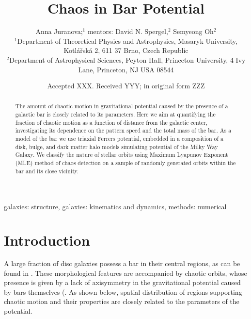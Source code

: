 \documentclass[a4paper,fleqn,usenatbib]{mnras}
\title[Chaos in Bar Potential]{Chaos in Bar Potential}
\author[A. Juranova et al.]{
Anna Juranova;$^{1}$ %
mentors: David N. Spergel,$^{2}$
Semyeong Oh$^{2}$
\\
$^{1}$Department of Theoretical Physics and Astrophysics, Masaryk University, Kotl\'a\v{r}sk\'a 2, 611 37 Brno, Czech Republic\\ %
$^{2}$Department of Astrophysical Sciences, Peyton Hall, Princeton University, 4 Ivy Lane, Princeton, NJ USA 08544\\
}
\date{Accepted XXX. Received YYY; in original form ZZZ}
\begin{document}
\label{firstpage}
\pagerange{\pageref{firstpage}--\pageref{lastpage}}
\maketitle

\begin{abstract}
The amount of chaotic motion in gravitational potential caused by the presence of a galactic bar is closely related to its parameters. Here we aim at quantifying the fraction of chaotic motion as a function of distance from the galactic center, investigating its dependence on the pattern speed and the total mass of the bar. As a model of the bar we use triaxial Ferrers potential, embedded in a composition of a disk, bulge, and dark matter halo models simulating potential of the Milky Way Galaxy. We classify the nature of stellar orbits using Maximum Lyapunov Exponent (MLE) method of chaos detection on a sample of randomly generated orbits within the bar and its close vicinity.\\

\end{abstract}

\begin{keywords}
galaxies: structure, galaxies: kinematics and dynamics, methods: numerical
\end{keywords}



\section{Introduction}

A large fraction of disc galaxies possess a bar in their central regions, as can be found in \cite{Spitzgal:2015}. These morphological features are accompanied by chaotic orbits, whose presence is given by a lack of axisymmetry in the gravitational potential caused by bars themselves (\cite{BinneyTremaine:2008}. As shown below, spatial distribution of regions supporting chaotic motion and their properties are closely related to the parameters of the potential.
\end{document}
